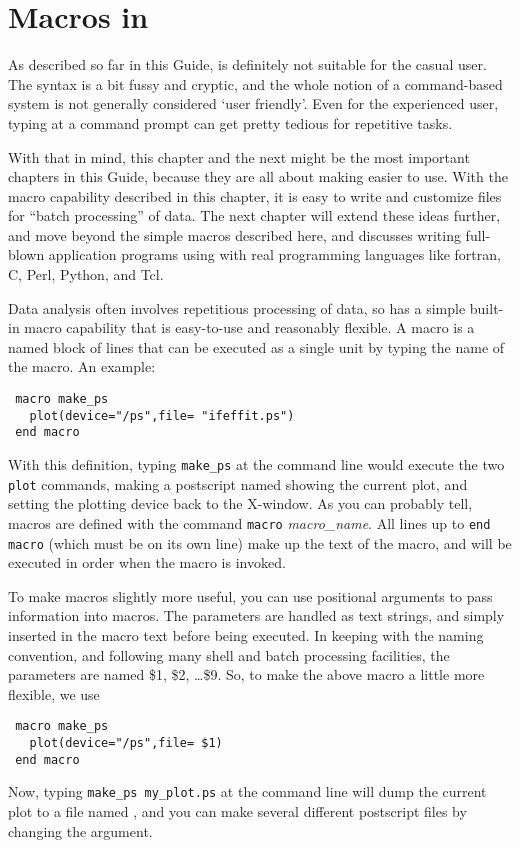 \section{Macros in  {\ifeffit}} \label{Ch:Macros}

As described so far in this Guide, {\ifeffit} is definitely not suitable
for the casual user.  The syntax is a bit fussy and cryptic, and the whole
notion of a command-based system is not generally considered `user
friendly'.  Even for the experienced user, typing at a command prompt can
get pretty tedious for repetitive tasks.

With that in mind, this chapter and the next might be the most important
chapters in this Guide, because they are all about making {\ifeffit} easier
to use.  With the macro capability described in this chapter, it is easy to
write and customize files for ``batch processing'' of data.  The next
chapter will extend these ideas further, and move beyond the simple macros
described here, and discusses writing full-blown application programs using
{\ifeffit} with real programming languages like fortran, C, Perl, Python,
and Tcl.

Data analysis often involves repetitious processing of data, so {\ifeffit}
has a simple built-in macro capability that is easy-to-use and reasonably
flexible.  A macro is a named block of {\ifeffit} lines that can be
executed as a single unit by typing the name of the macro.  An example:
\begin{verbatim}
 macro make_ps
   plot(device="/ps",file= "ifeffit.ps")
 end macro
\end{verbatim}
\noindent
With this definition, typing {\texttt{make\_ps}} at the command line would
execute the two {\texttt{plot}} commands, making a postscript named
{} showing the current plot, and setting the plotting
device back to the X-window.  As you can probably tell, macros are defined
with the command {\texttt{macro} {\textsl{macro\_name}}}.  All lines up to
{\texttt{end macro}} (which must be on its own line) make up the text of
the macro, and will be executed in order when the macro is invoked.

To make macros slightly more useful, you can use positional arguments to
pass information into macros.  The parameters are handled as text strings,
and simply inserted in the macro text before being executed.  In keeping
with the {\ifeffit} naming convention, and following many shell and batch
processing facilities, the parameters are named \$1, \$2, \ldots \$9.  So,
to make the above macro a little more flexible, we use
\begin{verbatim}
 macro make_ps
   plot(device="/ps",file= $1)
 end macro
\end{verbatim} %
\noindent
Now, typing {\texttt{make\_ps my\_plot.ps}} at the command line will dump
the current plot to a file named {}, and you can make
several different postscript files by changing the argument.

